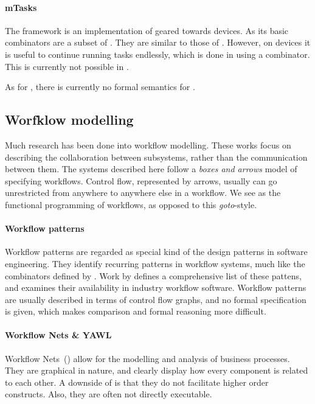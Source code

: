 \paragraph{mTasks}

The \MTASKS framework is an implementation of \TOP geared towards \IOT devices.
As \TOPHAT its basic combinators are a subset of \ITASKS.
They are similar to those of \TOPHAT.
However, on \IOT devices it is useful to continue running tasks endlessly,
which is done in \MTASKS using a  combinator.
This is currently not possible in \TOPHAT.

As for \ITASKS, there is currently no formal semantics for \MTASKS.



\subsection{Worfklow modelling}

Much research has been done into workflow modelling. These works focus on
describing the collaboration between subsystems, rather than the communication
between them.
The systems described here follow a \emph{boxes and arrows} model of specifying workflows.
Control flow, represented by arrows, usually can go unrestricted from anywhere to anywhere else in a workflow.
We see \TOP as the functional programming of workflows, as opposed to this \emph{goto}-style.

\paragraph{Workflow patterns}

Workflow patterns are regarded as special kind of the design patterns in
software engineering. They identify recurring patterns in workflow systems, much
like the combinators defined by \TOPHAT. Work by \citet{journals/dpd/AalstHKB03}
defines a comprehensive list of these
pattens, and examines their availability in industry workflow software.
Workflow patterns are usually described in terms of control flow graphs, and no
formal specification is given, which makes comparison and formal reasoning more
difficult.

\paragraph{Workflow Nets \& YAWL}

Workflow Nets~(\WFN) \cite{journals/jcsc/Aalst98} allow for the modelling and analysis of business processes.
They are graphical in nature, and clearly display how every component is related to each other.
A downside of \WFN is that they do not facilitate higher order constructs.
Also, they are often not directly executable.

